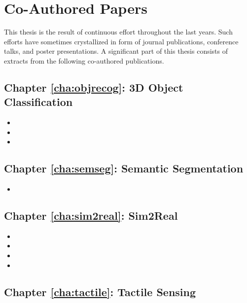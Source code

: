 \section{Co-Authored Papers}
\label{cha:introduction:sec:papers}

This thesis is the result of continuous effort throughout the last years. Such efforts have sometimes crystallized in form of journal publications, conference talks, and poster presentations. A significant part of this thesis consists of extracts from the following co-authored publications.

\subsection{Chapter \ref{cha:objrecog}: 3D Object Classification}

\begin{itemize}
  \item {}
  \item {}
  \item {}
\end{itemize}

\subsection{Chapter \ref{cha:semseg}: Semantic Segmentation}

\begin{itemize}
  \item {}
\end{itemize}

\subsection{Chapter \ref{cha:sim2real}: Sim2Real}

\begin{itemize}
    \item {}
    \item {}
    \item {}
    \item {}
  \end{itemize}

\subsection{Chapter \ref{cha:tactile}: Tactile Sensing}

